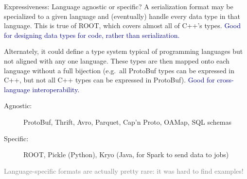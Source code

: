 \documentclass[aspectratio=169]{beamer}
\begin{document}
\begin{frame}{Expressiveness: Language agnostic or specific?}
\vspace{0.5 cm}
A serialization format may be specialized to a given language and (eventually) handle every data type in that language. This is true of ROOT, which covers almost all of C++'s types. \textcolor{darkblue}{Good for designing data types for code, rather than serialization.}

\vfill

Alternately, it could define a type system typical of programming languages but not aligned with any one language. These types are then mapped onto each language without a full bijection (e.g.\ all ProtoBuf types can be expressed in C++, but not all C++ types can be expressed in ProtoBuf). \textcolor{darkblue}{Good for cross-language interoperability.}

\vfill

\begin{description}
\item[Agnostic:] ProtoBuf, Thrift, Avro, Parquet, Cap'n Proto, OAMap, SQL schemas
\item[Specific:] ROOT, Pickle (Python), Kryo (Java, for Spark to send data to jobs)
\end{description}

\textcolor{gray}{Language-specific formats are actually pretty rare: it was hard to find examples!}
\end{frame}
\end{document}
